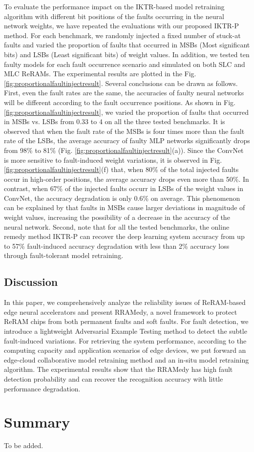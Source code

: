 To evaluate the performance impact on the IKTR-based model retraining algorithm with different bit positions of the faults occurring in the neural network weights,  we have repeated the evaluations with our proposed IKTR-P method. For each benchmark, we randomly injected a fixed number of stuck-at faults and varied the proportion of faults that occurred in MSBs (Most significant bits) and LSBs (Least significant bits) of weight values. In addition, we tested ten faulty models for each fault occurrence scenario and simulated on both SLC and MLC ReRAMs. The experimental results are plotted in the Fig. \ref{fig:proportionalfaultinjectresult}. Several conclusions can be drawn as follows. First, even the fault rates are the same, the accuracies of faulty neural networks will be different according to the fault occurrence positions. As shown in Fig. \ref{fig:proportionalfaultinjectresult}, we varied the proportion of faults that occurred in MSBs vs. LSBs from 0.33 to 4 on all the three tested benchmarks. It is observed that when the fault rate of the MSBs is four times more than the fault rate of the LSBs, the average accuracy of faulty MLP networks significantly drops from {98\%} to {81\%} (Fig. \ref{fig:proportionalfaultinjectresult}(a)). Since the ConvNet is more sensitive to fault-induced weight variations, it is observed in Fig. \ref{fig:proportionalfaultinjectresult}(f) that, when {80\%} of the total injected faults occur in high-order positions, the average accuracy drops even more than 50\%. In contrast, when {67\%} of the injected faults occurr in LSBs of the weight values in ConvNet, the accuracy degradation is only {0.6\%} on average. This phenomenon can be explained by that faults in MSBs cause larger deviations in magnitude of weight values, increasing the possibility of a decrease in the accuracy of the neural network. Second, note that for all the tested benchmarks, the online remedy method IKTR-P can recover the deep learning system accuracy from up to {57\%} fault-induced accuracy degradation with less than {2\%} accuracy loss through fault-tolerant model retraining.

\subsection{Discussion}
In this paper, we comprehensively analyze the reliability issues of ReRAM-based edge neural accelerators and present RRAMedy, a novel framework to protect ReRAM chips from both permanent faults and soft faults. For fault detection, we introduce a lightweight Adversarial Example Testing method to detect the subtle fault-induced variations. For retrieving the system performance, according to the computing capacity and application scenarios of edge devices, we put forward an edge-cloud collaborative model retraining method and an in-situ model retraining algorithm. The experimental results show that the RRAMedy has high fault detection probability and can recover the recognition accuracy with little performance degradation.

\section{Summary}
To be added.






